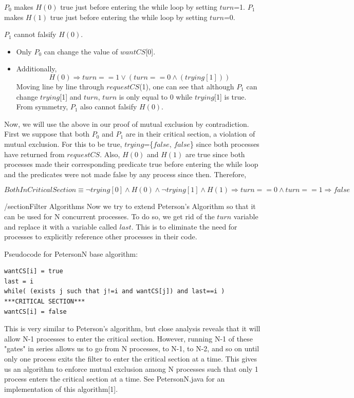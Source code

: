 \documentclass[twoside]{article}
\begin{document}
$P_0$ makes $H(0)$ true just before entering the while loop by setting $turn$=1.
$P_1$ makes $H(1)$ true just before entering the while loop by setting $turn$=0.

$P_1$ cannot falsify $H(0)$.
\begin{itemize}
  \item Only $P_0$ can change the value of $wantCS$[0].
  \item Additionally, 
\[H(0) \Rightarrow turn==1 \vee (turn==0 \wedge (trying[1]))\]
Moving line by line through $requestCS$(1), one can see that although $P_1$ can change $trying$[1] and $turn$, $turn$ is only equal to 0 while $trying$[1] is true. From symmetry, $P_1$ also cannot falsify $H(0)$.
\end{itemize}

Now, we will use the above in our proof of mutual exclusion by contradiction.  First we suppose that both $P_0$ and $P_1$ are in their critical section, a violation of mutual exclusion.  For this to be true, $trying$=\{$false$, $false$\} since both processes have returned from $requestCS$.  Also, $H(0)$ and $H(1)$ are true since both processes made their corresponding predicate true before entering the while loop and the predicates were not made false by any process since then.  Therefore,

\[Both In Critical Section \equiv \neg trying[0] \wedge H(0) \wedge \neg trying[1] \wedge H(1)\Rightarrow turn == 0 \wedge turn == 1\Rightarrow false\]

/section{Filter Algorithms}
Now we try to extend Peterson's Algorithm so that it can be used for N concurrent processes.  To do so, we get rid of the $turn$ variable and replace it with a variable called $last$.  This is to eliminate the need for processes to explicitly reference other processes in their code.

Pseudocode for PetersonN base algorithm:
\begin{verbatim}
wantCS[i] = true
last = i
while( (exists j such that j!=i and wantCS[j]) and last==i )
***CRITICAL SECTION***
wantCS[i] = false
\end{verbatim}

This is very similar to Peterson's algorithm, but close analysis reveals that it will allow N-1 processes to enter the critical section.  However, running N-1 of these "gates" in series allows us to go from N processes, to N-1, to N-2, and so on until only one process exits the filter to enter the critical section at a time.  This gives us an algorithm to enforce mutual exclusion among N processes such that only 1 process enters the critical section at a time.  See PetersonN.java for an implementation of this algorithm[1].  
\end{document}
